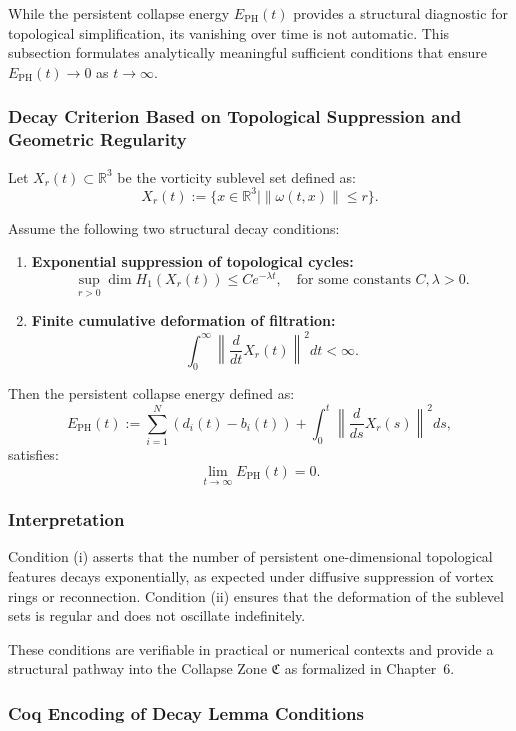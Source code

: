 \documentclass[11pt]{article}
\begin{document}
While the persistent collapse energy \( E_{\mathrm{PH}}(t) \) provides a structural diagnostic for topological simplification, its vanishing over time is not automatic. This subsection formulates analytically meaningful sufficient conditions that ensure \( E_{\mathrm{PH}}(t) \to 0 \) as \( t \to \infty \).

\subsubsection*{Decay Criterion Based on Topological Suppression and Geometric Regularity}

Let \( X_r(t) \subset \mathbb{R}^3 \) be the vorticity sublevel set defined as:
\[
X_r(t) := \{ x \in \mathbb{R}^3 \mid \|\omega(t,x)\| \leq r \}.
\]

Assume the following two structural decay conditions:
\begin{enumerate}
  \item[(i)] \textbf{Exponential suppression of topological cycles:}
  \[
  \sup_{r > 0} \dim H_1(X_r(t)) \leq C e^{-\lambda t}, \quad \text{for some constants } C, \lambda > 0.
  \]
  \item[(ii)] \textbf{Finite cumulative deformation of filtration:}
  \[
  \int_0^\infty \left\| \frac{d}{dt} X_r(t) \right\|^2 dt < \infty.
  \]
\end{enumerate}

Then the persistent collapse energy defined as:
\[
E_{\mathrm{PH}}(t) := \sum_{i=1}^N (d_i(t) - b_i(t)) + \int_0^t \left\| \frac{d}{ds} X_r(s) \right\|^2 ds,
\]
satisfies:
\[
\lim_{t \to \infty} E_{\mathrm{PH}}(t) = 0.
\]

\subsubsection*{Interpretation}

Condition (i) asserts that the number of persistent one-dimensional topological features decays exponentially, as expected under diffusive suppression of vortex rings or reconnection. Condition (ii) ensures that the deformation of the sublevel sets is regular and does not oscillate indefinitely.

These conditions are verifiable in practical or numerical contexts and provide a structural pathway into the Collapse Zone \( \mathfrak{C} \) as formalized in Chapter~6.

\subsubsection*{Coq Encoding of Decay Lemma Conditions}
\end{document}
